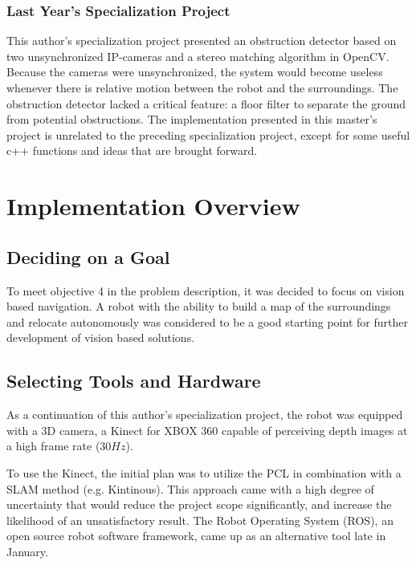 \subsubsection{Last Year's Specialization Project}

This author's specialization project\cite{lindrup} presented an obstruction detector based on two unsynchronized IP-cameras and a stereo matching algorithm in \ac{OpenCV}. Because the cameras were unsynchronized, the system would become useless whenever there is relative motion between the robot and the surroundings. The obstruction detector lacked a critical feature: a floor filter to separate the ground from potential obstructions. The implementation presented in this master's project is unrelated to the preceding specialization project, except for some useful c++ functions and ideas that are brought forward.

\section{Implementation Overview}

\subsection{Deciding on a Goal}

To meet objective 4 in the problem description, it was decided to focus on vision based navigation. A robot with the ability to build a map of the surroundings and relocate autonomously was considered to be a good starting point for further development of vision based solutions.

\subsection{Selecting Tools and Hardware}

As a continuation of this author's specialization project, the robot was equipped with a 3D camera, a Kinect for XBOX 360 capable of perceiving depth images at a high frame rate ($30 Hz$). 

To use the Kinect, the initial plan was to utilize the \ac{PCL} in combination with a \ac{SLAM} method (e.g. Kintinous\cite{Kintinous}). This approach came with a high degree of uncertainty that would reduce the project scope significantly, and increase the likelihood of an unsatisfactory result. The Robot Operating System (ROS), an open source robot software framework, came up as an alternative tool late in January. 

